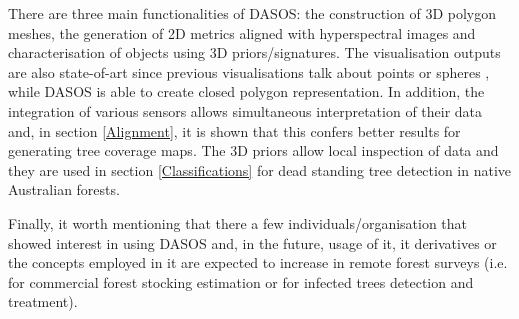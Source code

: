 \documentclass{subfiles}
\begin{document}
	   	\par There are three main functionalities of DASOS: the construction of 3D polygon meshes, the generation of 2D metrics aligned with hyperspectral images and characterisation of objects using 3D priors/signatures. The visualisation outputs are also state-of-art since previous visualisations talk about points \cite{Bunting2013} or spheres \cite{Chauve2009}, while DASOS is able to create closed polygon representation. In addition, the integration of various sensors allows simultaneous interpretation of their data and, in section \ref{Alignment}, it is shown that this confers better results for generating tree coverage maps. The 3D priors allow local inspection of data and they are used in section \ref{Classifications} for dead standing tree detection in native Australian forests.
	   		
	   	\par Finally, it worth mentioning that there a few individuals/organisation that showed interest in using DASOS and, in the future, usage of it, it derivatives or the concepts employed in it are expected to increase in remote forest surveys (i.e. for commercial forest stocking estimation or for infected trees detection and treatment).
	   	
\end{document}
